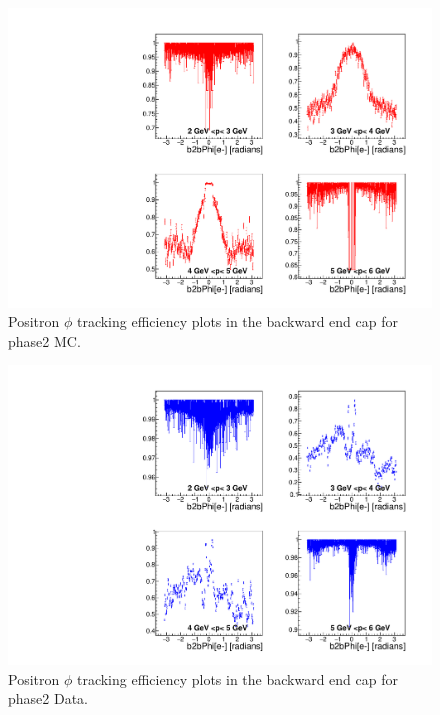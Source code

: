 \documentclass[a4paper,11pt,twosided,final,german,openbib,pdftex,listof=totoc,bibliography=totoc]{scrbook}
\begin{document}
\begin{appendix}






\begin{figure}[!htbp]
	\centering
	\includegraphics[width=\textwidth]{Plots/master/xPMPhiepEC_MC}
	\caption[Momentum $\phi$ Positron Backward End Cap Efficiency Phase2 MC]{Positron $\phi$ tracking efficiency plots in the backward end cap for phase2 MC.}
	\label{plt:PMPhiepEC_MC}
\end{figure}


\begin{figure}[!htbp]
	\centering
	\includegraphics[width=\textwidth]{Plots/master/xPMPhiepEC_Data}
	\caption[Momentum $\phi$ Positron Backward End Cap Efficiency Phase2 Data]{Positron $\phi$ tracking efficiency plots in the backward end cap for phase2 Data.}
	\label{plt:PMPhiepEC_Data}
\end{figure}




\end{appendix}
\end{document}
